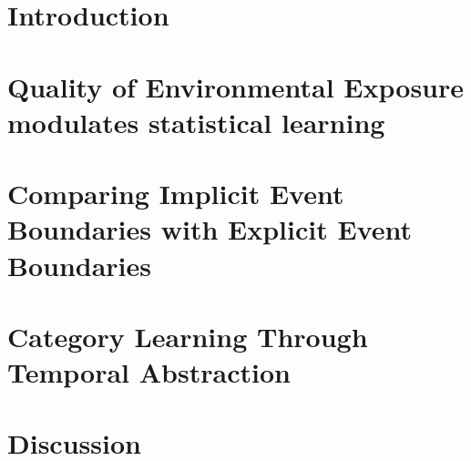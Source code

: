 \tableofcontents                %
\listoftables                   %
\listoffigures                  %


\mainmatter   %


\chapter{Introduction}
\label{introduction}


\newpage

\chapter{Quality of Environmental Exposure modulates statistical learning}
\label{chapter-2-walk-lengths-modulate-statistical-learning}


\newpage
\chapter{Comparing Implicit Event Boundaries with Explicit Event Boundaries}
\label{chapter-3-implicit-explicit-event-boundaries}


\chapter{Category Learning Through Temporal Abstraction}
\label{chapter-4-category-learning-through-temporal-abstraction}


\chapter{Discussion}






	



